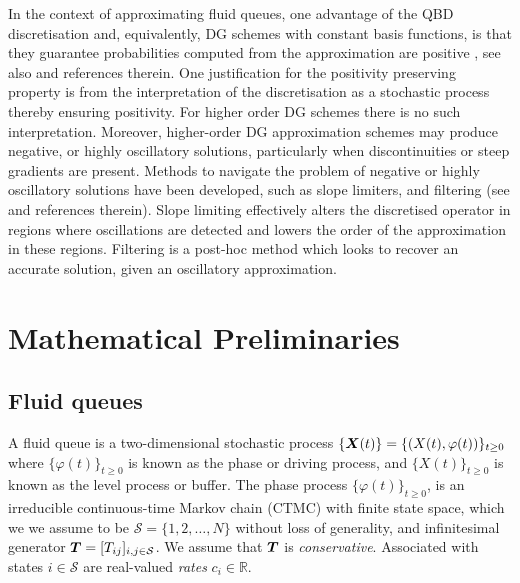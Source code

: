 
In the context of approximating fluid queues, one advantage of the QBD discretisation and, equivalently, DG schemes with constant basis functions, is that they guarantee probabilities computed from the approximation are positive \citep[Section 3.3]{koltai2011}, see also \citep{nodalDGBook} and references therein. One justification for the positivity preserving property is from the interpretation of the discretisation as a stochastic process thereby ensuring positivity. For higher order DG schemes there is no such interpretation. Moreover, higher-order DG approximation schemes may produce negative, or highly oscillatory solutions, particularly when discontinuities or steep gradients are present. Methods to navigate the problem of negative or highly oscillatory solutions have been developed, such as slope limiters, and filtering (see \citep[Section 6.5]{nodalDGBook} and references therein). Slope limiting effectively alters the discretised operator in regions where oscillations are detected and lowers the order of the approximation in these regions. Filtering is a post-hoc method which looks to recover an accurate solution, given an oscillatory approximation. 

\section{Mathematical Preliminaries}
\subsection{Fluid queues}
A fluid queue is a two-dimensional stochastic process \(\{\boldsymbol X(t)\} = \{(X(t),\varphi(t))\}_{t\geq0}\) where \(\{\varphi(t)\}_{t\geq0}\) is known as the phase or driving process, and \(\{X(t)\}_{t\geq0}\) is known as the level process or buffer. The phase process \(\{\varphi(t)\}_{t\geq0}\), is an irreducible continuous-time Markov chain (CTMC) with finite state space, which we we assume to be \(\mathcal S=\{1,2,\dots,N\}\) without loss of generality, and infinitesimal generator \(\boldsymbol T= [T_{ij}]_{i,j\in\mathcal S}\). We assume that \(\boldsymbol T\) is \emph{conservative}. Associated with states \(i\in\mathcal S\) are real-valued \emph{rates} \(c_i\in\mathbb R\). 

